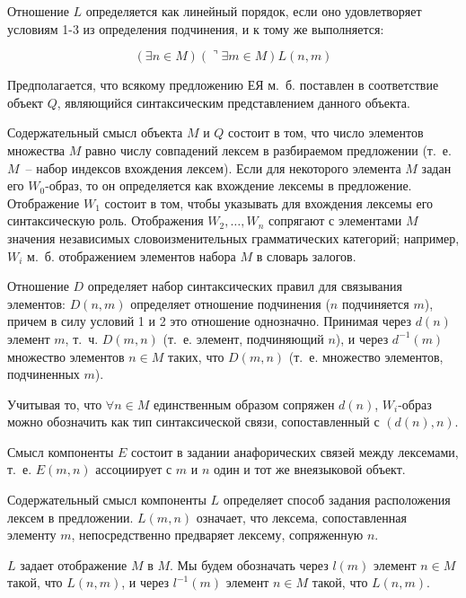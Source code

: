 \documentclass[a4paper,14pt,russian]{extreport}
\begin{document}
Отношение $L$ определяется как линейный порядок, если оно удовлетворяет условиям 1-3 из определения подчинения, и к тому же выполняется:

\begin{equation}
\left(\exists n\in M\right)\left(\urcorner\exists m\in M\right)L\left(n, m\right)
\end{equation}

Предполагается, что всякому предложению ЕЯ м.~б. поставлен в соответствие объект $Q$, являющийся синтаксическим представлением данного объекта.

Содержательный смысл объекта $M$ и $Q$ состоит в том, что число элементов множества $M$ равно числу совпадений лексем в разбираемом предложении (т.~е. $M$~-- набор индексов вхождения лексем). Если для некоторого элемента $M$ задан его $W_0$-образ, то он определяется как вхождение лексемы в предложение. Отображение $W_1$ состоит в том, чтобы указывать для вхождения лексемы его синтаксическую роль. Отображения $W_2,\dots,W_n$ сопрягают с элементами $M$ значения независимых словоизменительных грамматических категорий; например, $W_i$ м.~б. отображением элементов набора $M$ в словарь залогов.

Отношение $D$ определяет набор синтаксических правил для связывания элементов: $D\left(n, m\right)$ определяет отношение подчинения ($n$ подчиняется $m$), причем в силу условий 1 и 2 это отношение однозначно. Принимая через $d\left(n\right)$ элемент $m$, т.~ч. $D\left(m, n\right)$ (т.~е. элемент, подчиняющий $n$), и через $d^{-1}\left(m\right)$ множество элементов $n\in M$ таких, что $D\left(m, n\right)$ (т.~е. множество элементов, подчиненных $m$).

Учитывая то, что $\forall n\in M$ единственным образом сопряжен $d\left(n\right)$, $W_i$-образ можно обозначить как тип синтаксической связи, сопоставленный с $\left(d\left(n\right),n\right)$.

Смысл компоненты $E$ состоит в задании анафорических связей между лексемами, т.~е. $E\left(m, n\right)$ ассоциирует с $m$ и $n$ один и тот же внеязыковой объект.

Содержательный смысл компоненты $L$ определяет способ задания расположения лексем в предложении. $L\left(m, n\right)$ означает, что лексема, сопоставленная элементу $m$, непосредственно предваряет лексему, сопряженную $n$.

$L$ задает отображение $M$ в $M$. Мы будем обозначать через $l\left(m\right)$ элемент $n\in M$ такой, что $L\left(n, m\right)$, и через $l^{-1}\left(m\right)$ элемент $n\in M$ такой, что $L\left(n, m\right)$.
\end{document}
